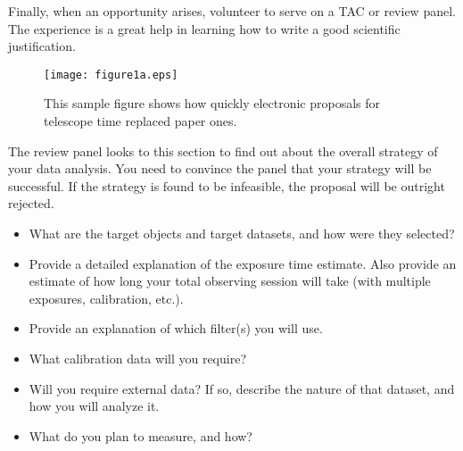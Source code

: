 \documentclass[11pt]{article}
\begin{document}
Finally, when an opportunity arises, volunteer to serve on
a TAC or review panel.  The experience is a great help in
learning how to write a good scientific justification.



\begin{figure}[hbt]
\texttt{[image: figure1a.eps]}
\caption{This sample figure shows how quickly electronic proposals
for telescope time replaced paper ones.}
\end{figure}


\clearpage


%

%

\expdesign
The review panel looks to this section to find out about the overall
strategy of your data analysis.  You need to convince the panel that your strategy will be successful.  If the strategy is found to be infeasible, the proposal will be outright rejected.

\begin{itemize}
  
\item
  What are the target objects and target datasets, and how were they selected?

\item
  Provide a detailed explanation of the exposure time estimate.  Also provide an estimate of how long your total observing session will take (with multiple exposures, calibration, etc.).

\item
  Provide an explanation of which filter(s) you will use.
  
\item
  What calibration data will you require?

\item
  Will you require external data?  If so, describe the nature of that dataset, and how you will analyze it.
  
\item
  What do you plan to measure, and how?

\end{itemize}
 
\end{document}
